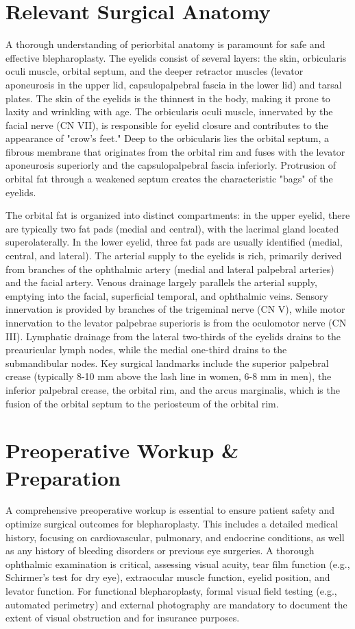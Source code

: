 \section*{Relevant Surgical Anatomy}
A thorough understanding of periorbital anatomy is paramount for safe and effective blepharoplasty. The eyelids consist of several layers: the skin, orbicularis oculi muscle, orbital septum, and the deeper retractor muscles (levator aponeurosis in the upper lid, capsulopalpebral fascia in the lower lid) and tarsal plates. The skin of the eyelids is the thinnest in the body, making it prone to laxity and wrinkling with age. The orbicularis oculi muscle, innervated by the facial nerve (CN VII), is responsible for eyelid closure and contributes to the appearance of "crow's feet." Deep to the orbicularis lies the orbital septum, a fibrous membrane that originates from the orbital rim and fuses with the levator aponeurosis superiorly and the capsulopalpebral fascia inferiorly. Protrusion of orbital fat through a weakened septum creates the characteristic "bags" of the eyelids.

The orbital fat is organized into distinct compartments: in the upper eyelid, there are typically two fat pads (medial and central), with the lacrimal gland located superolaterally. In the lower eyelid, three fat pads are usually identified (medial, central, and lateral). The arterial supply to the eyelids is rich, primarily derived from branches of the ophthalmic artery (medial and lateral palpebral arteries) and the facial artery. Venous drainage largely parallels the arterial supply, emptying into the facial, superficial temporal, and ophthalmic veins. Sensory innervation is provided by branches of the trigeminal nerve (CN V), while motor innervation to the levator palpebrae superioris is from the oculomotor nerve (CN III). Lymphatic drainage from the lateral two-thirds of the eyelids drains to the preauricular lymph nodes, while the medial one-third drains to the submandibular nodes. Key surgical landmarks include the superior palpebral crease (typically 8-10 mm above the lash line in women, 6-8 mm in men), the inferior palpebral crease, the orbital rim, and the arcus marginalis, which is the fusion of the orbital septum to the periosteum of the orbital rim.

\section*{Preoperative Workup \& Preparation}
A comprehensive preoperative workup is essential to ensure patient safety and optimize surgical outcomes for blepharoplasty. This includes a detailed medical history, focusing on cardiovascular, pulmonary, and endocrine conditions, as well as any history of bleeding disorders or previous eye surgeries. A thorough ophthalmic examination is critical, assessing visual acuity, tear film function (e.g., Schirmer's test for dry eye), extraocular muscle function, eyelid position, and levator function. For functional blepharoplasty, formal visual field testing (e.g., automated perimetry) and external photography are mandatory to document the extent of visual obstruction and for insurance purposes.

